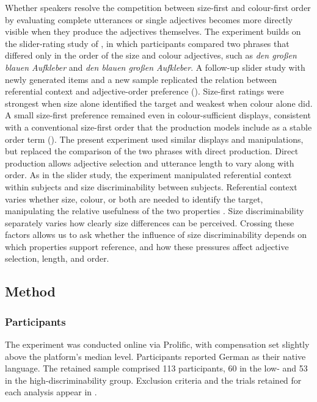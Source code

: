 \documentclass[10pt,a4paper,fleqn]{article}
\begin{document}
Whether speakers resolve the competition between size-first and colour-first order by evaluating complete utterances or single adjectives becomes more directly visible when they produce the adjectives themselves.
The experiment builds on the slider-rating study of \citet{schlotterbeck2023incremental}, in which participants compared two phrases that differed only in the order of the size and colour adjectives, such as \emph{den gro{\ss}en blauen Aufkleber} and \emph{den blauen gro{\ss}en Aufkleber}.
A follow-up slider study with newly generated items and a new sample replicated the relation between referential context and adjective-order preference ().
Size-first ratings were strongest when size alone identified the target and weakest when colour alone did.
A small size-first preference remained even in colour-sufficient displays, consistent with a conventional size-first order that the production models include as a stable order term ().
The present experiment used similar displays and manipulations, but replaced the comparison of the two phrases with direct production.
Direct production allows adjective selection and utterance length to vary along with order.
As in the slider study, the experiment manipulated referential context within subjects and size discriminability between subjects.
Referential context varies whether size, colour, or both are needed to identify the target, manipulating the relative usefulness of the two properties \citep{fukumura2018ordering,rubio2020incrementality,rubio2021wordorder}.
Size discriminability separately varies how clearly size differences can be perceived.
Crossing these factors allows us to ask whether the influence of size discriminability depends on which properties support reference, and how these pressures affect adjective selection, length, and order.


\subsection{Method}

\subsubsection{Participants}

The experiment was conducted online via Prolific, with compensation set slightly above the platform's median level.
Participants reported German as their native language.
The retained sample comprised 113 participants, 60 in the low- and 53 in the high-discriminability group.
Exclusion criteria and the trials retained for each analysis appear in .
\end{document}
